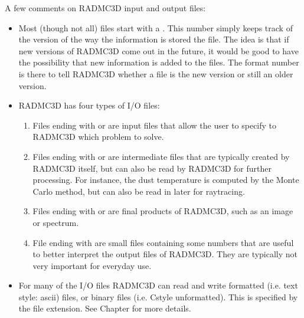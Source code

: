 \documentclass[letterpaper,10pt,english]{sphinxmanual}
\begin{document}
A few comments on RADMC\sphinxhyphen{}3D input and output files:
\begin{itemize}
\item {} 
Most (though not all) files start with a . This number simply
keeps track of the version of the way the information is stored the file. The
idea is that if new versions of RADMC\sphinxhyphen{}3D come out in the future, it would be
good to have the possibility that new information is added to the files. The
format number is there to tell RADMC\sphinxhyphen{}3D whether a file is the new version or
still an older version.

\item {} 
RADMC\sphinxhyphen{}3D has four types of I/O files:
\begin{enumerate}
%
\item {} 
Files ending with  or  are input files that
allow the user to specify to RADMC\sphinxhyphen{}3D which problem to solve.

\item {} 
Files ending with  or are intermediate
files that are typically created by RADMC\sphinxhyphen{}3D itself, but can also be read
by RADMC\sphinxhyphen{}3D for further processing. For instance, the dust temperature is
computed by the Monte Carlo method, but can also be read in later for
ray\sphinxhyphen{}tracing.

\item {} 
Files ending with  or  are final products of
RADMC\sphinxhyphen{}3D, such as an image or spectrum.

\item {} 
File ending with  are small files containing some numbers that are
useful to better interpret the output files of RADMC\sphinxhyphen{}3D. They are typically
not very important for every\sphinxhyphen{}day use.

\end{enumerate}

\item {} 
For many of the I/O files RADMC\sphinxhyphen{}3D can read and write formatted (i.e. text
style: ascii) files, or binary files (i.e. C\sphinxhyphen{}style unformatted). This is
specified by the file extension. See Chapter {\hyperref[\detokenize{binaryio:chap-binary-io}]{}} for more
details.

\end{itemize}
\end{document}
